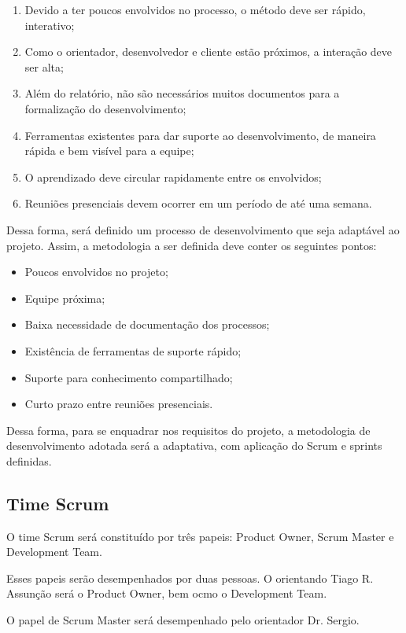 \begin{enumerate}
    \item Devido a ter poucos envolvidos no processo, o método deve ser rápido, interativo;
    \item Como o orientador, desenvolvedor e cliente estão próximos, a interação deve ser alta;
    \item Além do relatório, não são necessários muitos documentos para a formalização do desenvolvimento;
    \item Ferramentas existentes para dar suporte ao desenvolvimento, de maneira rápida e bem visível para a equipe;
    \item O aprendizado deve circular rapidamente entre os envolvidos;
    \item Reuniões presenciais devem ocorrer em um período de até uma semana.
\end{enumerate}

Dessa forma, será definido um processo de desenvolvimento que seja adaptável
ao projeto. Assim, a metodologia a ser definida deve conter os seguintes pontos:

\begin{itemize}
        \item Poucos  envolvidos no projeto;
        \item Equipe próxima;
        \item Baixa necessidade de documentação dos processos;
        \item Existência de ferramentas de suporte rápido;
        \item Suporte para conhecimento compartilhado;
        \item Curto prazo entre reuniões presenciais.
\end{itemize}

Dessa forma, para se enquadrar nos requisitos do projeto, a metodologia de desenvolvimento
adotada será a adaptativa, com aplicação do Scrum e sprints definidas.

\subsection{Time Scrum}
\label{subsec:timescrum}
O time Scrum será constituído por três papeis: Product Owner, Scrum Master e Development Team.

Esses papeis serão desempenhados por duas pessoas. O orientando Tiago R. Assunção será o Product
Owner, bem ocmo o Development Team.

O papel de Scrum Master será desempenhado pelo orientador Dr. Sergio. 

